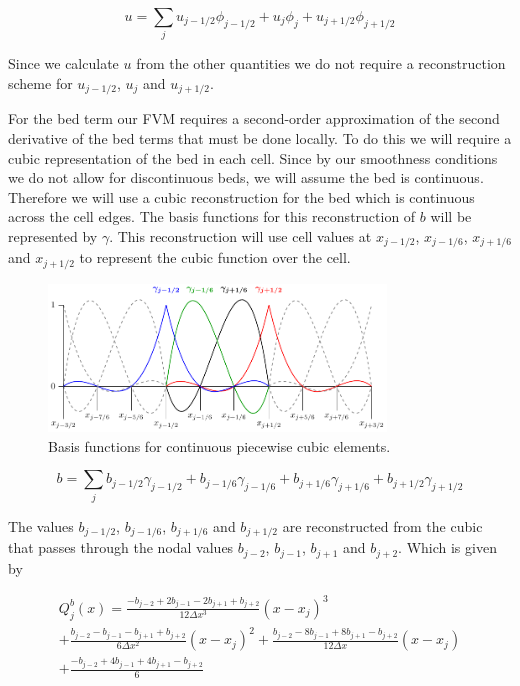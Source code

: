 \begin{equation}
u = \sum_j u_{j-1/2}\phi_{j-1/2} + u_{j}\phi_{j} + u_{j+1/2}\phi_{j+1/2}
\end{equation}

Since we calculate $u$ from the other quantities we do not require a reconstruction scheme for $u_{j-1/2}$, $u_j$ and $u_{j+1/2}$.



For the bed term our FVM requires a second-order approximation of the second derivative of the bed terms that must be done locally. To do this we will require a cubic representation of the bed in each cell. Since by our smoothness conditions we do not allow for discontinuous beds, we will assume the bed is continuous. Therefore we will use a cubic reconstruction for the bed which is continuous across the cell edges. The basis functions for this reconstruction of $b$ will be represented by $\gamma$. This reconstruction will use cell values at $x_{j-1/2}$, $x_{j-1/6}$, $x_{j+1/6}$ and $x_{j + 1/2}$ to represent the cubic function over the cell. 


\begin{figure}
	\centering
	\includegraphics[width=0.8\textwidth]{./chp3/figures/P3.pdf}
	\caption{Basis functions for continuous piecewise cubic elements.}
	\label{fig:P3ContBasis}
\end{figure}

\begin{equation}
b = \sum_j b_{j-1/2}\gamma_{j-1/2} + b_{j-1/6}\gamma_{j-1/6}  + b_{j+1/6}\gamma_{j+1/6} + b_{j+1/2}\gamma_{j+1/2}
\end{equation}

The values $b_{j-1/2}$, $b_{j-1/6}$, $b_{j+1/6}$  and $b_{j+1/2}$ are reconstructed from the cubic that passes through the nodal values $b_{j-2}$, $b_{j-1}$, $b_{j+1}$  and $b_{j+2}$. Which is given by

\begin{multline}
Q^b_j(x)= \frac{-b_{j-2} +2 b_{j-1} - 2 b_{j+1} + b_{j+2}}{12\Delta x^3} \left(x - x_j\right)^3 \\ +  \frac{b_{j-2} - b_{j-1} - b_{j+1} + b_{j+2}}{6\Delta x^2} \left(x - x_j\right)^2 +  \frac{b_{j-2} - 8b_{j-1} +8 b_{j+1} - b_{j+2}}{12\Delta x} \left(x - x_j\right) \\ + \frac{-b_{j-2} + 4b_{j-1} + 4 b_{j+1} - b_{j+2}}{6}
\end{multline}

